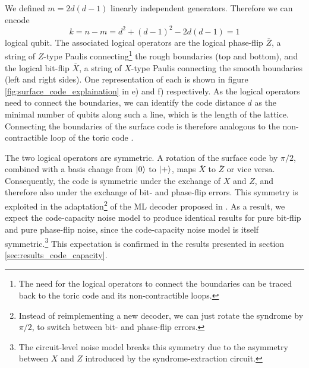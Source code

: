 We defined $m=2d(d-1)$ linearly independent generators.
Therefore we can encode
\begin{equation}
    k = n-m = d^2 + (d-1)^2 - 2d(d-1) = 1
\end{equation} 
logical qubit.
The associated logical operators are the logical phase-flip $\bar{Z}$, a string of $Z$-type Paulis connecting\footnote{
    The need for the logical operators to connect the boundaries can be traced back to the toric code and its non-contractible loops.
    } the rough boundaries (top and bottom),
and the logical bit-flip $\bar{X}$, a string of $X$-type Paulis connecting the smooth boundaries (left and right sides).
One representation of each is shown in figure \ref{fig:surface_code_explaination} in e) and f) respectively.
As the logical operators need to connect the boundaries, we can identify the code distance $d$ as the minimal number of qubits along such a line, which is the length of the lattice.
Connecting the boundaries of the surface code is therefore analogous to the non-contractible loop of the toric code \cite{topological_quantum_memory}.

The two logical operators are symmetric.
A rotation of the surface code by $\pi/2$, combined with a basis change from $\ket{0}$ to $\ket{+}$, maps $\bar{X}$ to $\bar{Z}$ or vice versa. 
Consequently, the code is symmetric under the exchange of $X$ and $Z$, and therefore also under the exchange of bit- and phase-flip errors. 
This symmetry is exploited in the adaptation\footnote{
    Instead of reimplementing a new decoder, we can just rotate the syndrome by $\pi/2$, to switch between bit- and phase-flip errors.
} of the ML decoder proposed in \cite{efficient_decoding_algorithm}.
As a result, we expect the code-capacity noise model to produce identical results for pure bit-flip and pure phase-flip noise, since the code-capacity noise model is itself symmetric.\footnote{
The circuit-level noise model breaks this symmetry due to the asymmetry between $X$ and $Z$ introduced by the syndrome-extraction circuit.
} This expectation is confirmed in the results presented in section \ref{sec:results_code_capacity}.

